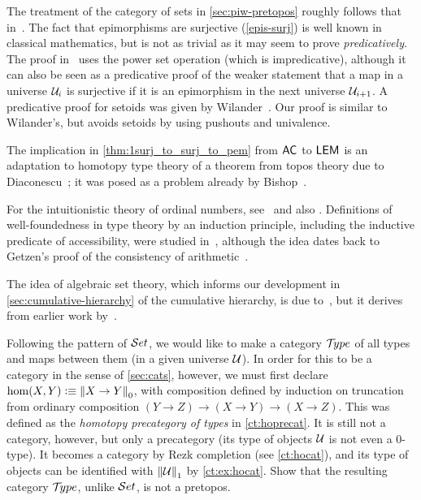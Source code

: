 The treatment of the category of sets in \autoref{sec:piw-pretopos} roughly follows that in~\cite{RijkeSpitters}.
The fact that epimorphisms are surjective (\autoref{epis-surj}) is well known in classical mathematics, but is not as trivial as it may seem to prove \emph{predicatively}.
The proof in~\cite{Mines/R/R:1988} uses the power set operation (which is impredicative), although it can also be seen as a predicative proof of the weaker statement that a map in a universe $\mathcal{U}_i$ is surjective if it is an epimorphism in the next universe $\mathcal{U}_{i+1}$.
A predicative proof for setoids was given by Wilander~\cite{Wilander2010}. 
Our proof is similar to Wilander's, but avoids setoids by using pushouts and univalence.

The implication in \autoref{thm:1surj_to_surj_to_pem} from $\mathsf{AC}_{}$ to $\mathsf{LEM}_{}$ is an adaptation to homotopy type
theory of a theorem from topos theory due to Diaconescu~\cite{Diaconescu}; it was posed as a problem already by Bishop~\cite[Problem~2]{Bishop1967}.

For the intuitionistic theory of ordinal numbers, see~\cite{taylor:ordinals} and also \cite{JoyalMoerdijk1995}.
Definitions of well-foundedness in type theory by an induction principle, including the inductive predicate of accessibility, were studied in~\cite{Huet80,Paulson86,Nordstrom88}, although the idea dates back to Getzen's proof of the consistency of arithmetic~\cite{Gentzen36}.

The idea of algebraic set theory, which informs our development in \autoref{sec:cumulative-hierarchy} of the cumulative hierarchy, is due to~\cite{JoyalMoerdijk1995}, but it derives from earlier work by~\cite{AczelCZF}.


\sectionExercises

\begin{ex}
Following the pattern of $\mathcal{S}et$, we would like to make a category $\mathcal{T}\!ype$ of all types and maps between them (in a given universe $\mathcal{U}$).  In order for this to be a category in the sense of \autoref{sec:cats}, however, we must first declare $\hom(X,Y) \vcentcolon\equiv \mathopen{}\left\Vert X\to Y\right\Vert_{0}\mathclose{}$, with composition defined by induction on truncation from ordinary composition $(Y\to Z) \to (X\to Y) \to (X\to Z)$.  This was defined as the \emph{homotopy precategory of types} in \autoref{ct:hoprecat}.  It is still not a category, however, but only a precategory (its type of objects $\mathcal{U}$ is not even a $0$-type).  It becomes a category by Rezk completion (see \autoref{ct:hocat}), and its type of objects can be identified with $\mathopen{}\left\Vert \mathcal{U}\right\Vert_{1}\mathclose{}$ by \autoref{ct:ex:hocat}.  Show that the resulting category $\mathcal{T}\!ype$, unlike $\mathcal{S}et$, is not a pretopos.
\end{ex}

